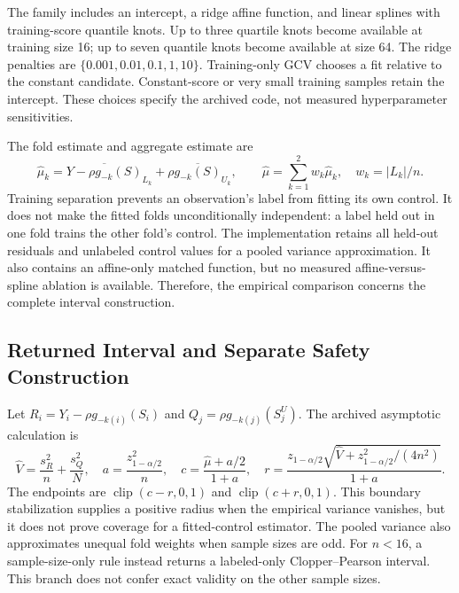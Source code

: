 \documentclass{article}
\newcommand{\clip}{\operatorname{clip}}
\begin{document}
The family includes an intercept, a ridge affine function, and linear splines with training-score quantile knots. Up to three quartile knots become available at training size 16; up to seven quantile knots become available at size 64. The ridge penalties are $\{0.001,0.01,0.1,1,10\}$. Training-only GCV chooses a fit relative to the constant candidate. Constant-score or very small training samples retain the intercept. These choices specify the archived code, not measured hyperparameter sensitivities.

The fold estimate and aggregate estimate are
\begin{equation}
\widehat\mu_k=\overline{Y-\rho g_{-k}(S)}_{L_k}
+\rho\overline{g_{-k}(S)}_{U_k},\qquad
\widehat\mu=\sum_{k=1}^{2}w_k\widehat\mu_k,\quad w_k=|L_k|/n.
\label{eq:fold}
\end{equation}
Training separation prevents an observation's label from fitting its own control. It does not make the fitted folds unconditionally independent: a label held out in one fold trains the other fold's control. The implementation retains all held-out residuals and unlabeled control values for a pooled variance approximation. It also contains an affine-only matched function, but no measured affine-versus-spline ablation is available. Therefore, the empirical comparison concerns the complete interval construction.

\subsection{Returned Interval and Separate Safety Construction}
Let $R_i=Y_i-\rho g_{-k(i)}(S_i)$ and $Q_j=\rho g_{-k(j)}(S_j^U)$. The archived asymptotic calculation is
\begin{equation}
\widehat V=\frac{s_R^2}{n}+\frac{s_Q^2}{N},\quad
a=\frac{z_{1-\alpha/2}^2}{n},\quad
c=\frac{\widehat\mu+a/2}{1+a},\quad
r=\frac{z_{1-\alpha/2}\sqrt{\widehat V+z_{1-\alpha/2}^2/(4n^2)}}{1+a}.
\label{eq:stabilized}
\end{equation}
The endpoints are $\clip(c-r,0,1)$ and $\clip(c+r,0,1)$. This boundary stabilization supplies a positive radius when the empirical variance vanishes, but it does not prove coverage for a fitted-control estimator. The pooled variance also approximates unequal fold weights when sample sizes are odd. For $n<16$, a sample-size-only rule instead returns a labeled-only Clopper--Pearson interval. This branch does not confer exact validity on the other sample sizes.
\end{document}
